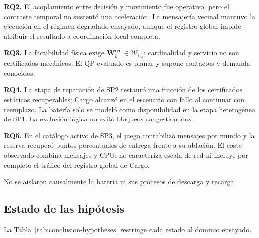 \textbf{RQ2.} El acoplamiento entre decisión y movimiento fue operativo, pero el
contraste temporal no sustentó una aceleración. La mensajería vecinal mantuvo la
ejecución en el régimen degradado ensayado, aunque el registro global impide
atribuir el resultado a coordinación local completa.

\textbf{RQ3.} La factibilidad física exige
$\boldsymbol W_k^{\mathrm{req}}\in\mathcal W_{C_k}$; cardinalidad y servicio no
son certificados mecánicos. El QP evaluado es planar y supone contactos y
demanda conocidos.

\textbf{RQ4.} La etapa de reparación de SP2 restauró una fracción
\SPSixConditionalRestore{} de los \SPSixRecoverableWorlds{} certificados
estáticos recuperables; Cargo alcanzó \CargoEtwoEFailureSuccess{} en el escenario
con fallo al continuar con reemplazo. La batería solo se modeló como
disponibilidad en la etapa heterogénea de SP1. La exclusión lógica no evitó
bloqueos congestionados.

\textbf{RQ5.} En el catálogo activo de SP3, el juego contabilizó
\SPSevenProposedMessages{} mensajes por mundo y la reserva recuperó
\SPSevenHOneEffectPP{} puntos porcentuales de entrega frente a su ablación. El
coste observado combina mensajes y CPU; no caracteriza escala de red ni incluye
por completo el tráfico del registro global de Cargo.

No se aislaron causalmente la batería ni sus procesos de descarga y recarga.

\subsection{Estado de las hipótesis}

La Tabla~\ref{tab:conclusion-hypotheses} restringe cada estado al dominio ensayado.

